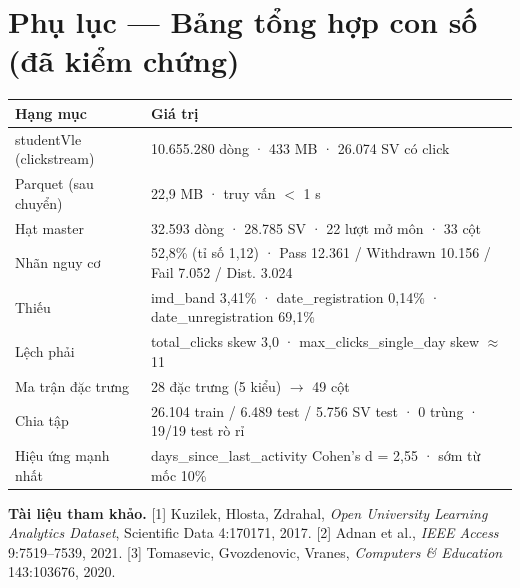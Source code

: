 \documentclass[11pt,a4paper]{article}
\begin{document}
\section*{Phụ lục — Bảng tổng hợp con số (đã kiểm chứng)}
\small
\begin{tabularx}{\linewidth}{@{}Xl@{}}
\toprule
\rowcolor{rowtint}\textbf{Hạng mục} & \textbf{Giá trị} \\
\midrule
studentVle (clickstream) & 10.655.280 dòng · 433 MB · 26.074 SV có click \\
Parquet (sau chuyển) & 22,9 MB · truy vấn $<$ 1 s \\
Hạt master & 32.593 dòng · 28.785 SV · 22 lượt mở môn · 33 cột \\
Nhãn nguy cơ & 52,8\% (tỉ số 1,12) · Pass 12.361 / Withdrawn 10.156 / Fail 7.052 / Dist. 3.024 \\
Thiếu & imd\_band 3,41\% · date\_registration 0,14\% · date\_unregistration 69,1\% \\
Lệch phải & total\_clicks skew 3,0 · max\_clicks\_single\_day skew $\approx$11 \\
Ma trận đặc trưng & 28 đặc trưng (5 kiểu) $\to$ 49 cột \\
Chia tập & 26.104 train / 6.489 test / 5.756 SV test · 0 trùng · 19/19 test rò rỉ \\
Hiệu ứng mạnh nhất & days\_since\_last\_activity Cohen's d = 2,55 · sớm từ mốc 10\% \\
\bottomrule
\end{tabularx}
\normalsize

\vspace{0.8em}
\noindent\textbf{Tài liệu tham khảo.}
[1] Kuzilek, Hlosta, Zdrahal, \textit{Open University Learning Analytics Dataset}, Scientific Data 4:170171, 2017.
[2] Adnan et al., \textit{IEEE Access} 9:7519--7539, 2021.
[3] Tomasevic, Gvozdenovic, Vranes, \textit{Computers \& Education} 143:103676, 2020.
\end{document}
